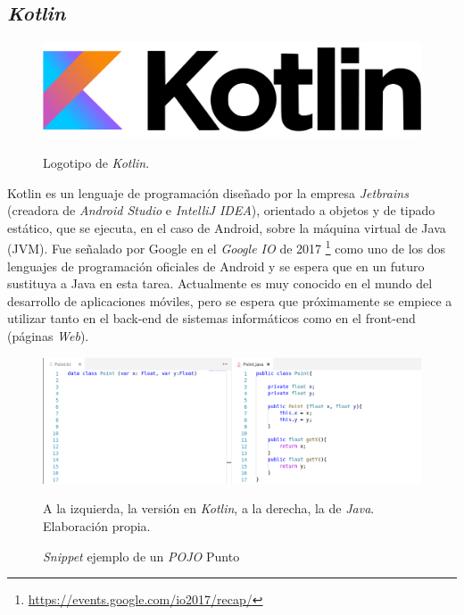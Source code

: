 \documentclass[twoside]{report}
\begin{document}
\subsection{\textit{Kotlin}}

\begin{figure}[H]
\centering
\includegraphics[scale=0.3]{images/kotlin}\\
\caption{Logotipo de \textit{Kotlin}.} \cite{kotlin}
\end{figure}

Kotlin\cite{smovkotlin} es un lenguaje de programación diseñado por la empresa \textit{Jetbrains} (creadora de \textit{Android Studio} e \textit{IntelliJ IDEA}), orientado a objetos y de tipado estático, que se ejecuta, en el caso de Android, sobre la máquina virtual de Java (JVM). Fue señalado por Google en el \textit{Google IO} de 2017 \footnote{\url{https://events.google.com/io2017/recap/}} como uno de los dos lenguajes de programación oficiales de Android y se espera que en un futuro sustituya a Java en esta tarea. Actualmente es muy conocido en el mundo del desarrollo de aplicaciones móviles, pero se espera que próximamente se empiece a utilizar tanto en el back-end de sistemas informáticos como en el front-end (páginas \textit{Web}).


\begin{figure}[H]
\centering
\includegraphics[width=\textwidth]{images/kotlinexample}\\
\caption{\textit{Snippet} ejemplo de un \textit{POJO} Punto} A la izquierda, la versión en \textit{Kotlin}, a la derecha, la de \textit{Java}. Elaboración propia.
\end{figure}
\end{document}

